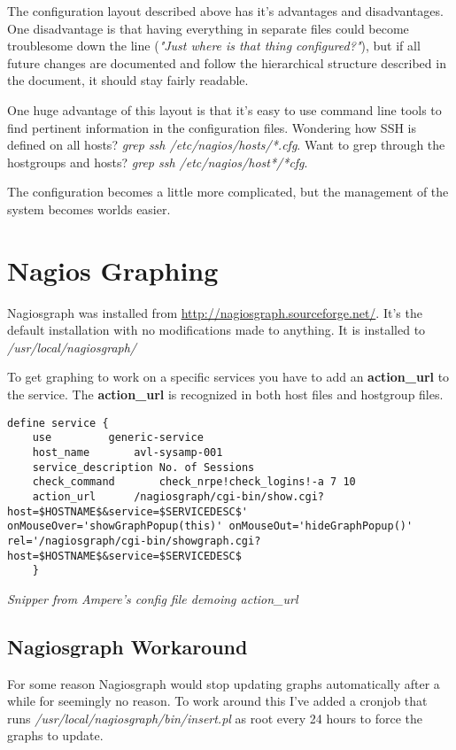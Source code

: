 \documentclass[a4paper]{article}
\begin{document}
The configuration layout described above has it's advantages and disadvantages. One disadvantage is that having everything in separate files could become troublesome down the line (\textit{"Just where is that thing configured?"}), but if all future changes are documented and follow the hierarchical structure described in the document, it should stay fairly readable.

One huge advantage of this layout is that it's easy to use command line tools to find pertinent information in the configuration files. Wondering how SSH is defined on all hosts? \textit{grep ssh /etc/nagios/hosts/*.cfg}. Want to grep through the hostgroups and hosts? \textit{grep ssh /etc/nagios/host*/*cfg}.

The configuration becomes a little more complicated, but the management of the system becomes worlds easier.


\section{Nagios Graphing}

Nagiosgraph was installed from \url{http://nagiosgraph.sourceforge.net/}. It's the default installation with no modifications made to anything. It is installed to \textit{/usr/local/nagiosgraph/}

To get graphing to work on a specific services you have to add an \textbf{action\_url} to the service. The \textbf{action\_url}  is recognized in both host files and hostgroup files.

\begin{lstlisting}[language=nagconf]
define service {
	use			generic-service
	host_name		avl-sysamp-001
	service_description	No. of Sessions
	check_command		check_nrpe!check_logins!-a 7 10
    action_url		/nagiosgraph/cgi-bin/show.cgi?host=$HOSTNAME$&service=$SERVICEDESC$' onMouseOver='showGraphPopup(this)' onMouseOut='hideGraphPopup()' rel='/nagiosgraph/cgi-bin/showgraph.cgi?host=$HOSTNAME$&service=$SERVICEDESC$
    }
\end{lstlisting}
\hfill \textit{Snipper from Ampere's config file demoing action\_url}\\

\subsection{Nagiosgraph Workaround}
For some reason Nagiosgraph would stop updating graphs automatically after a while for seemingly no reason. To work around this I've added a cronjob that runs \textit{/usr/local/nagiosgraph/bin/insert.pl} as root every 24 hours to force the graphs to update.
\end{document}
